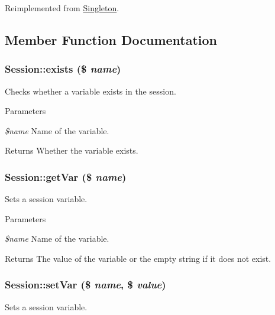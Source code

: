 Reimplemented from \hyperlink{classSingleton}{Singleton}.



\subsection{Member Function Documentation}
\hypertarget{classSession_a1747aaae205a1e90e14cb9de48120cd8}{
\subsubsection[{exists}]{\setlength{\rightskip}{0pt plus 5cm}Session::exists (\$ {\em name})}}
\label{classSession_a1747aaae205a1e90e14cb9de48120cd8}
Checks whether a variable exists in the session.


\begin{DoxyParams}{Parameters}
\item[{\em \$name}]Name of the variable.\end{DoxyParams}
\begin{DoxyReturn}{Returns}
Whether the variable exists. 
\end{DoxyReturn}
\hypertarget{classSession_a8cbfa64ffa31a33a61d62d4396985e07}{
\subsubsection[{getVar}]{\setlength{\rightskip}{0pt plus 5cm}Session::getVar (\$ {\em name})}}
\label{classSession_a8cbfa64ffa31a33a61d62d4396985e07}
Sets a session variable.


\begin{DoxyParams}{Parameters}
\item[{\em \$name}]Name of the variable.\end{DoxyParams}
\begin{DoxyReturn}{Returns}
The value of the variable or the empty string if it does not exist. 
\end{DoxyReturn}
\hypertarget{classSession_aed85e756b6654874dfd6c94f0382d061}{
\subsubsection[{setVar}]{\setlength{\rightskip}{0pt plus 5cm}Session::setVar (\$ {\em name}, \/  \$ {\em value})}}
\label{classSession_aed85e756b6654874dfd6c94f0382d061}
Sets a session variable.


